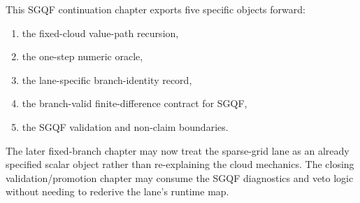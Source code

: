 This SGQF continuation chapter exports five specific objects forward:
\begin{enumerate}[leftmargin=0.28in]
  \item the fixed-cloud value-path recursion,
  \item the one-step numeric oracle,
  \item the lane-specific branch-identity record,
  \item the branch-valid finite-difference contract for SGQF,
  \item the SGQF validation and non-claim boundaries.
\end{enumerate}
The later fixed-branch chapter may now treat the sparse-grid lane as an already
specified scalar object rather than re-explaining the cloud mechanics.  The
closing validation/promotion chapter may consume the SGQF diagnostics and veto
logic without needing to rederive the lane’s runtime map.
